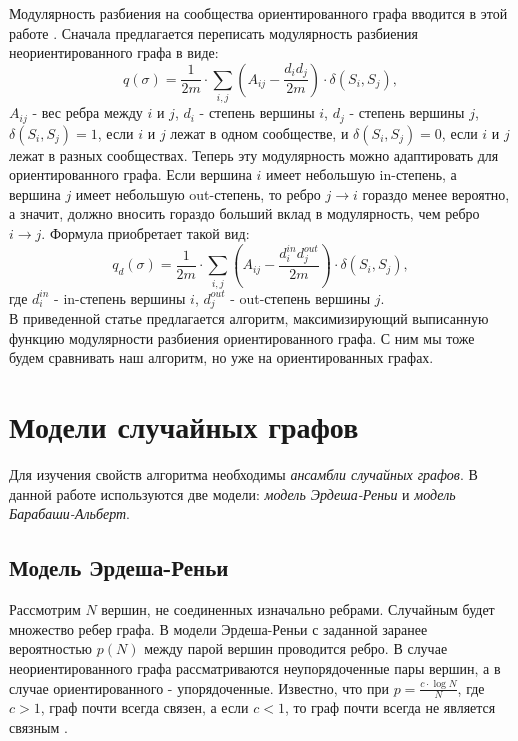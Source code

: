 Модулярность разбиения на сообщества ориентированного графа вводится в этой работе \cite{louvain}. Сначала предлагается переписать модулярность разбиения неориентированного графа в виде:
\begin{equation}
q(\sigma) = \frac{1}{2m}\cdot \sum_{i,j} (A_{ij}-\frac{d_id_j}{2m})\cdot\delta(S_i, S_j),
\end{equation}
$A_{ij}$ - вес ребра между $i$ и $j$, $d_i$ - степень вершины $i$, $d_j$ - степень вершины $j$, $\delta(S_i, S_j)=1$, если $i$ и $j$ лежат в одном сообществе, и $\delta(S_i, S_j)=0$, если $i$ и $j$ лежат в разных сообществах. Теперь эту модулярность можно адаптировать для ориентированного графа. Если вершина $i$ имеет небольшую in-степень, а вершина $j$ имеет небольшую out-степень, то ребро $j \rightarrow i$ гораздо менее вероятно, а значит, должно вносить гораздо больший вклад в модулярность, чем ребро $i \rightarrow j$. Формула приобретает такой вид:
\begin{equation}
q_d(\sigma) = \frac{1}{2m}\cdot \sum_{i,j} (A_{ij}-\frac{d_i^{in}d_j^{out}}{2m})\cdot\delta(S_i, S_j),
\end{equation}
где $d_i^{in}$ - in-степень вершины $i$, $d_j^{out}$ - out-степень вершины $j$.\\

В приведенной статье \cite{louvain} предлагается алгоритм, максимизирующий выписанную функцию модулярности разбиения ориентированного графа. С ним мы тоже будем сравнивать наш алгоритм, но уже на ориентированных графах.

\section{Модели случайных графов}
Для изучения свойств алгоритма необходимы \textit{ансамбли случайных графов}. В данной работе используются две модели: \textit{модель Эрдеша-Реньи} и \textit{модель Барабаши-Альберт}.

\subsection{Модель Эрдеша-Реньи}
Рассмотрим $N$ вершин, не соединенных изначально ребрами. Случайным будет множество ребер графа. В модели Эрдеша-Реньи с заданной заранее вероятностью $p(N)$ между парой вершин проводится ребро. В случае неориентированного графа рассматриваются неупорядоченные пары вершин, а в случае ориентированного - упорядоченные. Известно, что при $p=\frac{c\cdot \log N}{N}$, где $c>1$, граф почти всегда связен, а если $c<1$, то граф почти всегда не является связным \cite{randomgraphs}.

